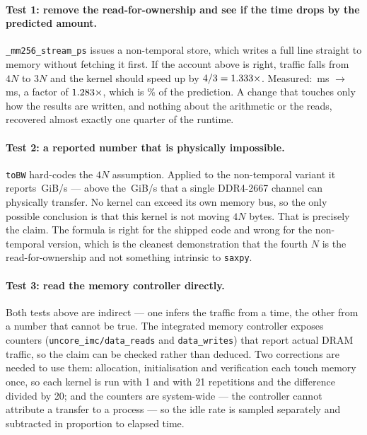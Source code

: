\documentclass[11pt,a4paper]{article}
\newcommand{\ms}[1]{#1\,ms}
\begin{document}
\paragraph{Test 1: remove the read-for-ownership and see if the time drops by
the predicted amount.} \texttt{\_mm256\_stream\_ps} issues a non-temporal
store, which writes a full line straight to memory without fetching it first.
If the account above is right, traffic falls from $4N$ to $3N$ and the kernel
should speed up by $4/3 = 1.333\times$. Measured:
\ms{\prognFiveStoreMs} $\rightarrow$ \ms{\prognFiveNtMs}, a factor of
$1.283\times$, which is \prognFiveNtAccuracy\% of the prediction.
A change that touches only how the results are written, and nothing about the
arithmetic or the reads, recovered almost exactly one quarter of the runtime.

\paragraph{Test 2: a reported number that is physically impossible.}
\texttt{toBW} hard-codes the $4N$ assumption. Applied to the non-temporal
variant it reports \prognFiveNtReported\,GiB/s --- above the
\prognFivePeakGiBs\,GiB/s that a single DDR4-2667 channel can physically
transfer. No kernel can exceed its own memory bus, so the only possible
conclusion is that this kernel is not moving $4N$ bytes. That is precisely the
claim. The formula is right for the shipped code and wrong for the
non-temporal version, which is the cleanest demonstration that the fourth $N$
is the read-for-ownership and not something intrinsic to \texttt{saxpy}.

\paragraph{Test 3: read the memory controller directly.} Both tests above
are indirect --- one infers the traffic from a time, the other from a number
that cannot be true. The integrated memory controller exposes counters
(\texttt{uncore\_imc/data\_reads} and \texttt{data\_writes}) that report actual
DRAM traffic, so the claim can be checked rather than deduced. Two corrections
are needed to use them: allocation, initialisation and verification each touch
memory once, so each kernel is run with 1 and with 21 repetitions and the
difference divided by 20; and the counters are system-wide --- the controller
cannot attribute a transfer to a process --- so the idle rate is sampled
separately and subtracted in proportion to elapsed time.
\end{document}
